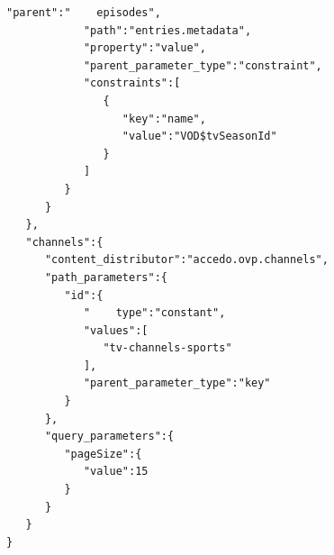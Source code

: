 \begin{appendices}
\begin{lstlisting}[frame=single,linewidth=15cm,breaklines=true,caption=Example of VMO/multiple DMOs that were used for testing]
            "parent":"    episodes",
            "path":"entries.metadata",
            "property":"value",
            "parent_parameter_type":"constraint",
            "constraints":[  
               {  
                  "key":"name",
                  "value":"VOD$tvSeasonId"
               }
            ]
         }
      }
   },
   "channels":{  
      "content_distributor":"accedo.ovp.channels",
      "path_parameters":{  
         "id":{  
            "    type":"constant",
            "values":[  
               "tv-channels-sports"
            ],
            "parent_parameter_type":"key"
         }
      },
      "query_parameters":{  
         "pageSize":{  
            "value":15
         }
      }
   }
}
\end{lstlisting}

\end{appendices}
